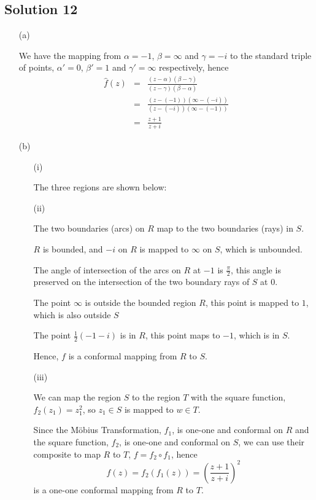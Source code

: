 \subsection*{Solution 12}

\begin{itemize}
\item[(a)]

We have the mapping from
$\alpha=-1$, $\beta=\infty$ and $\gamma=-i$
to the standard triple of points,
$\alpha'=0$, $\beta'=1$ and $\gamma'=\infty$ respectively,
hence
%
\begin{eqnarray*}
\hat{f}(z)
	&=& \frac{ (z-\alpha)(\beta-\gamma) }{ (z-\gamma)(\beta-\alpha) } \\
	&=& \frac{ (z-(-1))(\infty-(-i)) }{ (z-(-i))(\infty-(-1)) } \\
	&=& \frac{ z+1 }{ z+i }
\end{eqnarray*}

\item[(b)]

\begin{itemize}
\item[(i)]

The three regions are shown below:



\item[(ii)]

The two boundaries (arcs) on $R$ map to the two boundaries (rays) in $S$.

$R$ is bounded, and $-i$ on $R$ is mapped to $\infty$ on $S$, which
is unbounded.

The angle of intersection of the arcs on $R$ at $-1$ is $\frac{\pi}{2}$,
this angle is preserved on the intersection of the two boundary rays of
$S$ at $0$.

The point $\infty$ is outside the bounded region $R$, this point is
mapped to $1$, which is also outside $S$

The point $\frac{1}{2}(-1-i)$ is in $R$, this point maps to $-1$, which
is in $S$.

Hence, $f$ is a conformal mapping from $R$ to $S$.

\item[(iii)]

We can map the region $S$ to the region $T$ with the square function,
$f_2(z_1)=z_1^2$, so $z_1\in S$ is mapped to $w\in T$.

Since the M\"{o}bius Transformation, $f_1$, is one-one and conformal
on $R$ and the square function, $f_2$, is one-one and conformal on $S$,
we can use their composite to map $R$ to $T$, $f = f_2 \circ f_1$, hence
\[
f(z) = f_2 ( f_1(z) ) = \left( \frac{ z+1 }{ z+i } \right)^2
\]
is a one-one conformal mapping from $R$ to $T$.


\end{itemize}
\end{itemize}
